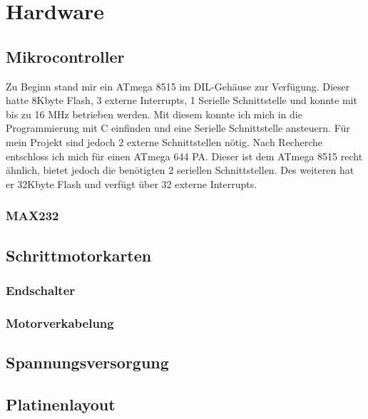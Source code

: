 \chapter{Hardware}
\label{sec:Hardware}
\section{Mikrocontroller}
Zu Beginn stand mir ein ATmega 8515\cite{atmel_8515} im DIL-Gehäuse zur Verfügung. Dieser hatte 8Kbyte Flash, 3 externe Interrupts, 1 Serielle Schnittstelle und konnte mit bis zu 16 MHz betrieben werden. Mit diesem konnte ich mich in die Programmierung mit C einfinden und eine Serielle Schnittstelle ansteuern. Für mein Projekt sind jedoch 2 externe Schnittstellen nötig. Nach Recherche entschloss ich mich für einen ATmega 644 PA.  Dieser ist dem ATmega 8515 recht ähnlich, bietet jedoch die benötigten 2 seriellen Schnittstellen. Des weiteren hat er 32Kbyte Flash und verfügt über 32 externe Interrupts. 
\subsection{MAX232}
\section{Schrittmotorkarten}
\subsection{Endschalter}
\subsection{Motorverkabelung}
\section{Spannungsversorgung}
\section{Platinenlayout}